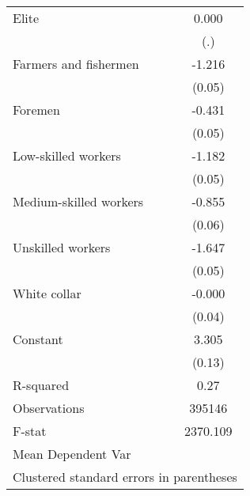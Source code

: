 {\begin{tabular}{l*{1}{c}}
Elite               &       0.000         \\
                    &         (.)         \\
Farmers and fishermen&      -1.216\sym{***}\\
                    &      (0.05)         \\
Foremen             &      -0.431\sym{***}\\
                    &      (0.05)         \\
Low-skilled workers &      -1.182\sym{***}\\
                    &      (0.05)         \\
Medium-skilled workers&      -0.855\sym{***}\\
                    &      (0.06)         \\
Unskilled workers   &      -1.647\sym{***}\\
                    &      (0.05)         \\
White collar        &      -0.000         \\
                    &      (0.04)         \\
Constant            &       3.305\sym{***}\\
                    &      (0.13)         \\
\hline
R-squared           &        0.27         \\
Observations        &      395146         \\
F-stat              &    2370.109         \\
Mean Dependent Var  &                     \\
\hline\hline
\multicolumn{2}{l}{\footnotesize Clustered standard errors in parentheses}\\
\end{tabular}
}
